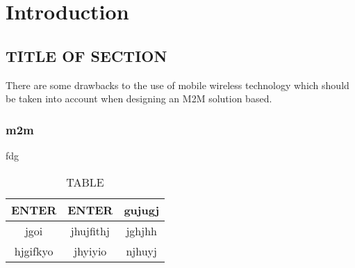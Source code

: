\chapter{Introduction}
\label{ChapterIntroduction}
%
\section{TITLE OF SECTION}
There are some drawbacks to the use of mobile wireless technology which should be taken into account when designing an M2M solution based.
\subsection{m2m}
fdg
\begin{table}
\centering
\begin{tabular}{|c|c|c|}
  \hline
  ENTER & ENTER & gujugj \\
  \hline
  jgoi & jhujfithj & jghjhh \\
  \hline
  hjgifkyo & jhyiyio & njhuyj \\
  \hline
\end{tabular}
\caption{TABLE}
\end{table}
